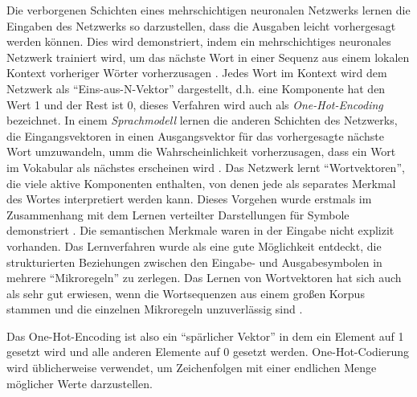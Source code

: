 Die verborgenen Schichten eines mehrschichtigen neuronalen Netzwerks lernen die Eingaben des Netzwerks so darzustellen, dass die Ausgaben leicht vorhergesagt werden können. Dies wird demonstriert, indem ein mehrschichtiges neuronales Netzwerk trainiert wird, um das nächste Wort in einer Sequenz aus einem lokalen Kontext vorheriger Wörter vorherzusagen \cite*{Bengio2003}. Jedes Wort im Kontext wird dem Netzwerk als \enquote{Eins-aus-N-Vektor} dargestellt, d.h. eine Komponente hat den Wert 1 und der Rest ist 0, dieses Verfahren wird auch als \textit{One-Hot-Encoding} bezeichnet. In einem \textit{Sprachmodell} lernen die anderen Schichten des Netzwerks, die Eingangsvektoren in einen Ausgangsvektor für das vorhergesagte nächste Wort umzuwandeln, umm die Wahrscheinlichkeit vorherzusagen, dass ein Wort im Vokabular als nächstes erscheinen wird \cite*{Lecun2015}. Das Netzwerk lernt \enquote{Wortvektoren}, die viele aktive Komponenten enthalten, von denen jede als separates Merkmal des Wortes interpretiert werden kann. Dieses Vorgehen wurde erstmals im Zusammenhang mit dem Lernen verteilter Darstellungen für Symbole demonstriert \cite*{Rumelhart1986}. Die semantischen Merkmale waren in der Eingabe nicht explizit vorhanden. Das Lernverfahren wurde als eine gute Möglichkeit entdeckt, die strukturierten Beziehungen zwischen den Eingabe- und Ausgabesymbolen in mehrere \enquote{Mikroregeln} zu zerlegen. Das Lernen von Wortvektoren hat sich auch als sehr gut erwiesen, wenn die Wortsequenzen aus einem großen Korpus stammen und die einzelnen Mikroregeln unzuverlässig sind \cite*{Bengio2003}.


Das One-Hot-Encoding ist also ein \enquote{spärlicher Vektor} in dem ein Element auf 1 gesetzt wird und alle anderen Elemente auf 0 gesetzt werden. One-Hot-Codierung wird üblicherweise verwendet, um Zeichenfolgen mit einer endlichen Menge möglicher Werte darzustellen. 



